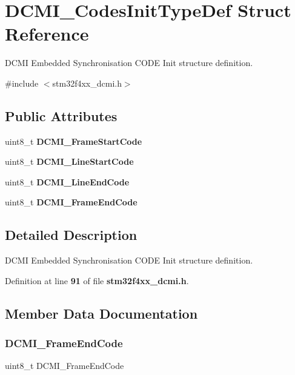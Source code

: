 \section{D\+C\+M\+I\+\_\+\+Codes\+Init\+Type\+Def Struct Reference}
\label{structDCMI__CodesInitTypeDef}


D\+C\+MI Embedded Synchronisation C\+O\+DE Init structure definition.  




{\ttfamily \#include $<$stm32f4xx\+\_\+dcmi.\+h$>$}

\subsection*{Public Attributes}
\begin{DoxyCompactItemize}
\item 
uint8\+\_\+t \textbf{ D\+C\+M\+I\+\_\+\+Frame\+Start\+Code}
\item 
uint8\+\_\+t \textbf{ D\+C\+M\+I\+\_\+\+Line\+Start\+Code}
\item 
uint8\+\_\+t \textbf{ D\+C\+M\+I\+\_\+\+Line\+End\+Code}
\item 
uint8\+\_\+t \textbf{ D\+C\+M\+I\+\_\+\+Frame\+End\+Code}
\end{DoxyCompactItemize}


\subsection{Detailed Description}
D\+C\+MI Embedded Synchronisation C\+O\+DE Init structure definition. 

Definition at line \textbf{ 91} of file \textbf{ stm32f4xx\+\_\+dcmi.\+h}.



\subsection{Member Data Documentation}
\mbox{\label{structDCMI__CodesInitTypeDef_a614a64246d94bc59bd8ba3d73151bfa6}} 
\subsubsection{D\+C\+M\+I\+\_\+\+Frame\+End\+Code}
{\footnotesize\ttfamily uint8\+\_\+t D\+C\+M\+I\+\_\+\+Frame\+End\+Code}

